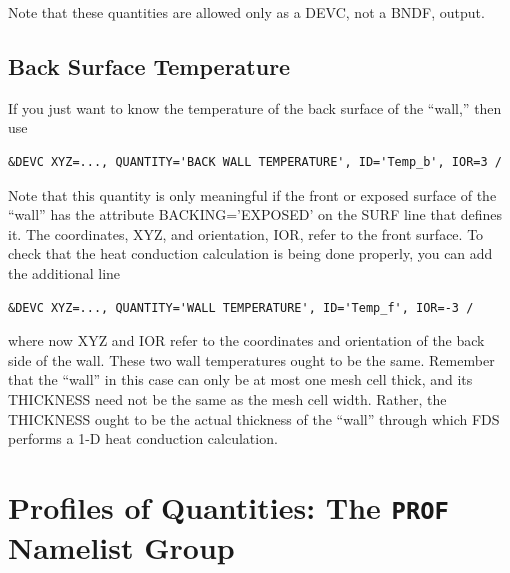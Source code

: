 \documentclass[11pt]{book}
\begin{document}
Note that these quantities are allowed only as a {\ct DEVC}, not a {\ct BNDF}, output.


\subsection{Back Surface Temperature}
\label{info:BACK}

If you just want to know the temperature of the back surface of the ``wall,'' then use
\begin{lstlisting}
&DEVC XYZ=..., QUANTITY='BACK WALL TEMPERATURE', ID='Temp_b', IOR=3 /
\end{lstlisting}
Note that this quantity is only meaningful if the front or exposed surface of the ``wall'' has the attribute {\ct BACKING='EXPOSED'} on the {\ct SURF} line that defines it. The coordinates, {\ct XYZ}, and orientation, {\ct IOR}, refer to the front surface. To check that the heat conduction calculation is being done properly, you can add the additional line
\begin{lstlisting}
&DEVC XYZ=..., QUANTITY='WALL TEMPERATURE', ID='Temp_f', IOR=-3 /
\end{lstlisting}
where now {\ct XYZ} and {\ct IOR} refer to the coordinates and orientation of the back side of the wall. These two wall temperatures ought to be the same. Remember that the ``wall'' in this case can only be at most one mesh cell thick, and its {\ct THICKNESS} need not be the same as the mesh cell width. Rather, the {\ct THICKNESS} ought to be the actual thickness of the ``wall'' through which FDS performs a 1-D heat conduction calculation.


\section{Profiles of Quantities: The \texorpdfstring{{\tt PROF}}{PROF} Namelist Group}
\label{info:PROF}
\end{document}

